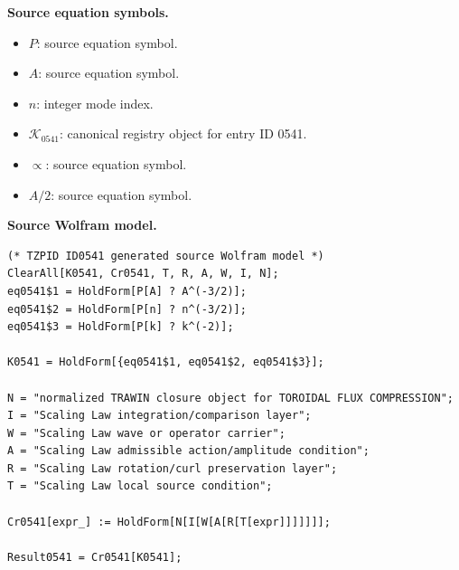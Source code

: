 \begin{minipage}[t]{0.49\linewidth}
\begingroup
\small
\raggedright
\textbf{Source equation symbols.}\par
\begin{itemize}[leftmargin=1.35em,itemsep=1pt,topsep=1pt,parsep=0pt]
    \item $P$: source equation symbol.
    \item $A$: source equation symbol.
    \item $n$: integer mode index.
    \item $\mathcal{K}_{0541}$: canonical registry object for entry ID 0541.
    \item $\propto$: source equation symbol.
    \item $A/2$: source equation symbol.
\end{itemize}
\endgroup
\end{minipage}\hfill
\begin{minipage}[t]{0.47\linewidth}
\begingroup
\scriptsize
\raggedright
\textbf{Source Wolfram model.}\par
\begin{Verbatim}[fontsize=\tiny,breaklines=true,breakanywhere=true]
(* TZPID ID0541 generated source Wolfram model *)
ClearAll[K0541, Cr0541, T, R, A, W, I, N];
eq0541$1 = HoldForm[P[A] ? A^(-3/2)];
eq0541$2 = HoldForm[P[n] ? n^(-3/2)];
eq0541$3 = HoldForm[P[k] ? k^(-2)];

K0541 = HoldForm[{eq0541$1, eq0541$2, eq0541$3}];

N = "normalized TRAWIN closure object for TOROIDAL FLUX COMPRESSION";
I = "Scaling Law integration/comparison layer";
W = "Scaling Law wave or operator carrier";
A = "Scaling Law admissible action/amplitude condition";
R = "Scaling Law rotation/curl preservation layer";
T = "Scaling Law local source condition";

Cr0541[expr_] := HoldForm[N[I[W[A[R[T[expr]]]]]]];

Result0541 = Cr0541[K0541];
\end{Verbatim}
\endgroup
\end{minipage}

